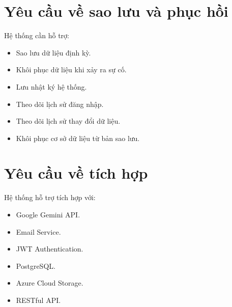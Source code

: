 
\section{Yêu cầu về sao lưu và phục hồi}

Hệ thống cần hỗ trợ:

\begin{itemize}

\item Sao lưu dữ liệu định kỳ.

\item Khôi phục dữ liệu khi xảy ra sự cố.

\item Lưu nhật ký hệ thống.

\item Theo dõi lịch sử đăng nhập.

\item Theo dõi lịch sử thay đổi dữ liệu.

\item Khôi phục cơ sở dữ liệu từ bản sao lưu.

\end{itemize}


\section{Yêu cầu về tích hợp}

Hệ thống hỗ trợ tích hợp với:

\begin{itemize}

\item Google Gemini API.

\item Email Service.

\item JWT Authentication.

\item PostgreSQL.

\item Azure Cloud Storage.

\item RESTful API.

\end{itemize}


